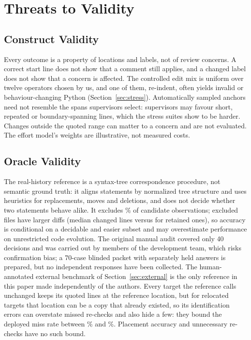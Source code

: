 \section{Threats to Validity}\label{sec:threats}

\subsection{Construct Validity}
Every outcome is a property of locations and labels, not of review concerns. A correct start line does not show that a comment still applies, and a changed label does not show that a concern is affected. The controlled edit mix is uniform over twelve operators chosen by us, and one of them, re-indent, often yields invalid or behaviour-changing Python (Section~\ref{sec:stress}). Automatically sampled anchors need not resemble the spans supervisors select: supervisors may favour short, repeated or boundary-spanning lines, which the stress suites show to be harder. Changes outside the quoted range can matter to a concern and are not evaluated. The effort model's weights are illustrative, not measured costs.

\subsection{Oracle Validity}
The real-history reference is a syntax-tree correspondence procedure, not semantic ground truth: it aligns statements by normalized tree structure and uses heuristics for replacements, moves and deletions, and does not decide whether two statements behave alike. It excludes \rExcludedPct\% of candidate observations; excluded files have larger diffs (median \wpaExclDiffMedian{} changed lines versus \wpaRetainedDiffMedian{} for retained ones), so accuracy is conditional on a decidable and easier subset and may overestimate performance on unrestricted code evolution. The original manual audit covered only 40 decisions and was carried out by members of the development team, which risks confirmation bias; a 70-case blinded packet with separately held answers is prepared, but no independent responses have been collected. The human-annotated external benchmark of Section~\ref{sec:external} is the only reference in this paper made independently of the authors. Every target the reference calls unchanged keeps its quoted lines at the reference location, but for relocated targets that location can be a copy that already existed, so its identification errors can overstate missed re-checks and also hide a few: they bound the deployed miss rate between \% and \%. Placement accuracy and unnecessary re-checks have no such bound.

